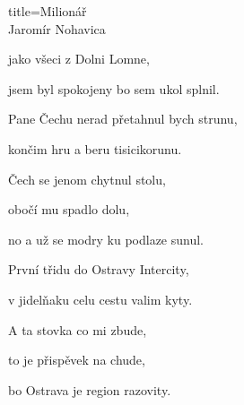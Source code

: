 \begin{song}{title=\centering Milionář \\\normalsize Jaromír Nohavica  \vspace*{-0.3cm}}
{\begin{minipage}[t]{0.48\textwidth}
jako všeci z Dolni Lomne, 

jsem byl spokojeny bo sem ukol splnil. 

\sloka
Pane Čechu nerad přetahnul bych strunu, 

končim hru a beru tisicikorunu. 

Čech se jenom chytnul stolu, 

obočí mu spadlo dolu, 

no a už se modry ku podlaze sunul. 

\sloka
První třidu do Ostravy Intercity, 

v jidelňaku celu cestu valim kyty.

A ta stovka co mi zbude, 

to je přispěvek na chude, 

bo Ostrava je region razovity.


\end{minipage}
}
\setcounter{Slokočet}{0}
\end{song}
